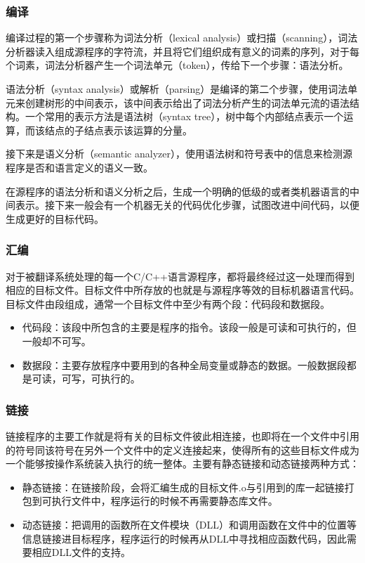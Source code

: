 \subsubsection{编译} 

编译过程的第一个步骤称为词法分析（lexical analysis）或扫描（scanning），词法分析器读入组成源程序的字符流，并且将它们组织成有意义的词素的序列，对于每个词素，词法分析器产生一个词法单元（token），传给下一个步骤：语法分析。

语法分析（syntax analysis）或解析（parsing）是编译的第二个步骤，使用词法单元来创建树形的中间表示，该中间表示给出了词法分析产生的词法单元流的语法结构。一个常用的表示方法是语法树（syntax tree），树中每个内部结点表示一个运算，而该结点的子结点表示该运算的分量。

接下来是语义分析（semantic analyzer），使用语法树和符号表中的信息来检测源程序是否和语言定义的语义一致。

在源程序的语法分析和语义分析之后，生成一个明确的低级的或者类机器语言的中间表示。接下来一般会有一个机器无关的代码优化步骤，试图改进中间代码，以便生成更好的目标代码。

\subsubsection{汇编} 

对于被翻译系统处理的每一个C/C++语言源程序，都将最终经过这一处理而得到相应的目标文件。目标文件中所存放的也就是与源程序等效的目标机器语言代码。目标文件由段组成，通常一个目标文件中至少有两个段：代码段和数据段。

\begin{itemize}
\item 代码段：该段中所包含的主要是程序的指令。该段一般是可读和可执行的，但一般却不可写。
\item 数据段：主要存放程序中要用到的各种全局变量或静态的数据。一般数据段都是可读，可写，可执行的。
\end{itemize}

\subsubsection{链接} 

链接程序的主要工作就是将有关的目标文件彼此相连接，也即将在一个文件中引用的符号同该符号在另外一个文件中的定义连接起来，使得所有的这些目标文件成为一个能够按操作系统装入执行的统一整体。主要有静态链接和动态链接两种方式：

\begin{itemize}
\item 静态链接：在链接阶段，会将汇编生成的目标文件.o与引用到的库一起链接打包到可执行文件中，程序运行的时候不再需要静态库文件。
\item 动态链接：把调用的函数所在文件模块（DLL）和调用函数在文件中的位置等信息链接进目标程序，程序运行的时候再从DLL中寻找相应函数代码，因此需要相应DLL文件的支持。  
\end{itemize}

